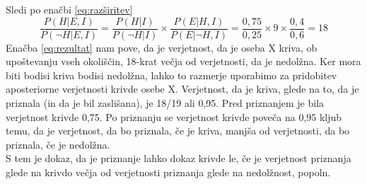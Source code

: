 \documentclass[fin1, tisk]{fmfdelo}
\theoremstyle{definition}
\theoremstyle{trditev}
\theoremstyle{izrek}
\begin{document}
Sledi po enačbi \eqref{eq:razširitev}
\begin{equation}\label{eq:rezultat}
    \frac{P(H \lvert E, I)}{P(\neg H \lvert E, I)}  = \frac{P(H \lvert I)}{P(\neg H \lvert I)}  \times \frac{P(E \lvert H, I)}{P(E \lvert \neg H, I)} = \frac{0,75}{0,25} \times 9 \times \frac{0,4}{0,6} = 18
\end{equation}
Enačba \eqref{eq:rezultat} nam pove, da je verjetnost, da je oseba X kriva, ob upoštevanju vseh okoliščin, 18-krat večja od verjetnosti, da je nedolžna. Ker mora biti 
bodisi kriva bodisi nedolžna, lahko to razmerje uporabimo za pridobitev aposteriorne verjetnosti krivde osebe X. Verjetnost, da je kriva, glede na to, 
da je priznala (in da je bil zaslišana), je 18/19 ali 0,95. Pred priznanjem je bila verjetnost krivde 0,75. Po priznanju se verjetnost krivde poveča 
na 0,95 kljub temu, da je verjetnost, da bo priznala, če je kriva, manjša od verjetnosti, da bo priznala, če je nedolžna. \\
S tem je dokaz, da je priznanje lahko dokaz krivde le, če je verjetnost priznanja glede na krivdo večja od verjetnosti priznanja glede na nedolžnost, popoln.

\end{document}
